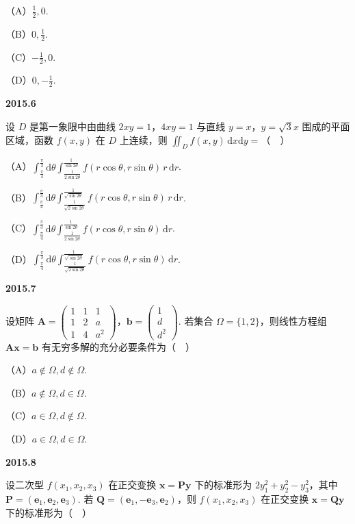 \documentclass[UTF8,12pt,fontset=windows]{ctexart}
\begin{document}
（A）$\frac{1}{2}, 0$.

（B）$0, \frac{1}{2}$.

（C）$-\frac{1}{2}, 0$.

（D）$0, -\frac{1}{2}$.

\vfill
\newpage
{\large\bfseries 2015.6}

设 $D$ 是第一象限中由曲线 $2xy = 1$，$4xy = 1$ 与直线 $y = x$，$y = \sqrt{3}x$ 围成的平面区域，函数 $f(x, y)$ 在 $D$ 上连续，则 $\iint_D f(x, y)\,\mathrm{d}x\mathrm{d}y =$（　）

（A）$\int_{\frac{\pi}{4}}^{\frac{\pi}{3}}\mathrm{d}\theta \int_{\frac{1}{2\sin 2\theta}}^{\frac{1}{\sin 2\theta}} f(r\cos\theta, r\sin\theta)\,r\,\mathrm{d}r$.

（B）$\int_{\frac{\pi}{4}}^{\frac{\pi}{3}}\mathrm{d}\theta \int_{\frac{1}{\sqrt{2\sin 2\theta}}}^{\frac{1}{\sqrt{\sin 2\theta}}} f(r\cos\theta, r\sin\theta)\,r\,\mathrm{d}r$.

（C）$\int_{\frac{\pi}{4}}^{\frac{\pi}{3}}\mathrm{d}\theta \int_{\frac{1}{2\sin 2\theta}}^{\frac{1}{\sin 2\theta}} f(r\cos\theta, r\sin\theta)\,\mathrm{d}r$.

（D）$\int_{\frac{\pi}{4}}^{\frac{\pi}{3}}\mathrm{d}\theta \int_{\frac{1}{\sqrt{2\sin 2\theta}}}^{\frac{1}{\sqrt{\sin 2\theta}}} f(r\cos\theta, r\sin\theta)\,\mathrm{d}r$.

\vfill
\newpage
{\large\bfseries 2015.7}

设矩阵 $\boldsymbol{A} = \begin{pmatrix} 1 & 1 & 1 \\ 1 & 2 & a \\ 1 & 4 & a^2 \end{pmatrix}$，$\boldsymbol{b} = \begin{pmatrix} 1 \\ d \\ d^2 \end{pmatrix}$. 若集合 $\Omega = \{1, 2\}$，则线性方程组 $\boldsymbol{Ax} = \boldsymbol{b}$ 有无穷多解的充分必要条件为（　）

（A）$a \notin \Omega, d \notin \Omega$.

（B）$a \notin \Omega, d \in \Omega$.

（C）$a \in \Omega, d \notin \Omega$.

（D）$a \in \Omega, d \in \Omega$.

\vfill
\newpage
{\large\bfseries 2015.8}

设二次型 $f(x_1, x_2, x_3)$ 在正交变换 $\boldsymbol{x} = \boldsymbol{Py}$ 下的标准形为 $2y_1^2 + y_2^2 - y_3^2$，其中 $\boldsymbol{P} = (\boldsymbol{e}_1, \boldsymbol{e}_2, \boldsymbol{e}_3)$. 若 $\boldsymbol{Q} = (\boldsymbol{e}_1, -\boldsymbol{e}_3, \boldsymbol{e}_2)$，则 $f(x_1, x_2, x_3)$ 在正交变换 $\boldsymbol{x} = \boldsymbol{Qy}$ 下的标准形为（　）
\end{document}

